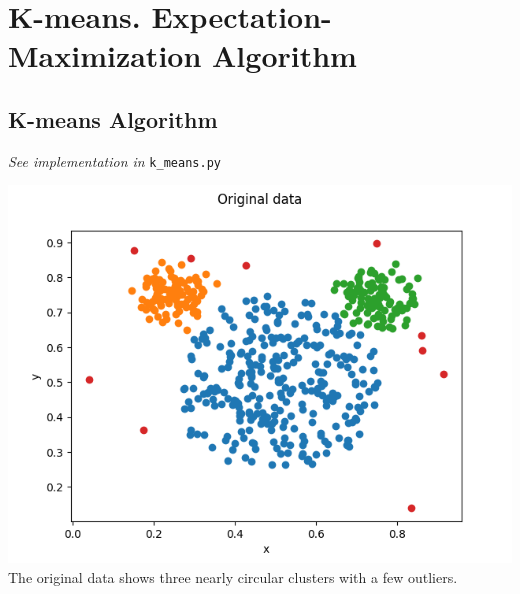     \section{K-means. Expectation-Maximization Algorithm}
    \subsection{K-means Algorithm}
    \label{subseq:kmeans}
    \textit{See implementation in} \texttt{k\_means.py}

    \includegraphics[width=\textwidth/2]{plots/mickey_original} \\
    The original data shows three nearly circular clusters with a few outliers.

